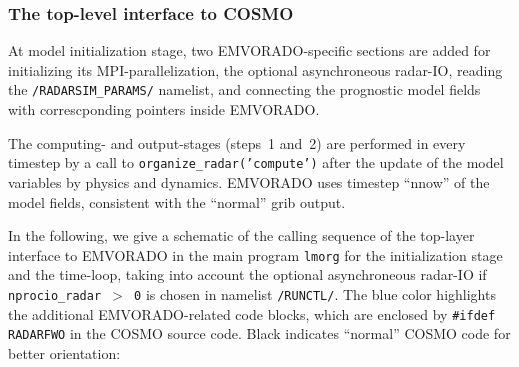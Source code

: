 \documentclass[10pt,a4paper,twoside,headinclude,footinclude,parskip=half]{scrartcl}
\newcommand{\myaktuellesection}{sec:intro}%
\newcommand{\labelsec}[1]{\label{#1}\renewcommand{\myaktuellesection}{#1}}%
\newcommand{\labelsec}[1]{\label{#1}}%
\newcommand{\srcform}[1]{\mbox{\texttt{#1}}\xspace}%
\begin{document}
\subsubsection{The top-level interface to COSMO}

\labelsec{sec:impltop}

At model initialization stage, two EMVORADO-specific sections are added for initializing
its MPI-parallelization, the optional asynchroneous radar-IO, reading the \srcform{/RADARSIM_PARAMS/} namelist,
and connecting the prognostic model fields with correscponding pointers inside EMVORADO.

The computing- and output-stages (steps~1 and~2) are performed in every timestep by a call to \srcform{organize_radar('compute')}
after the update of the model variables by physics and dynamics. EMVORADO uses timestep ``nnow'' of the model fields, consistent with the ``normal'' grib output.

In the following, we give a schematic of the calling sequence of the top-layer interface to EMVORADO in the main program \srcform{lmorg}
for the initialization stage and the time-loop, taking into account the optional asynchroneous radar-IO if
\srcform{nprocio_radar~$>$ 0} is chosen in namelist \srcform{/RUNCTL/}. The blue color highlights the
additional EMVORADO-related code blocks, which are enclosed by \srcform{\#ifdef RADARFWO} in the COSMO source code. Black indicates ``normal'' COSMO code for better orientation:
\end{document}
